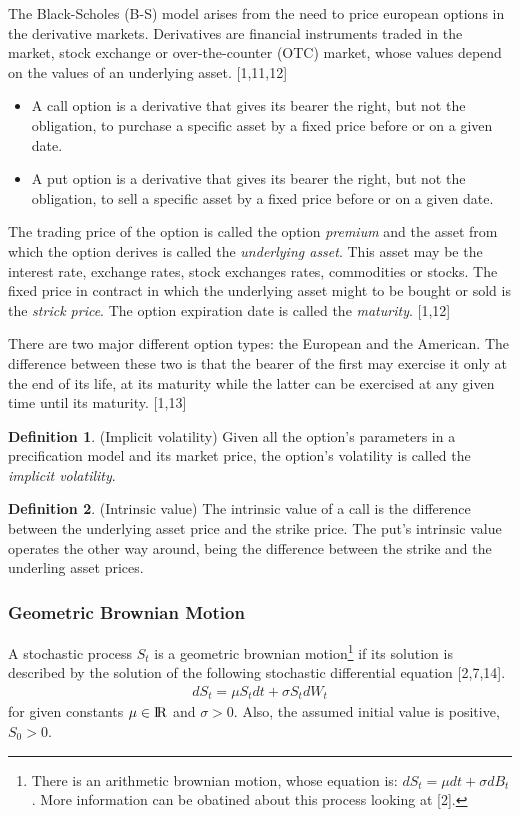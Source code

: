 \documentclass[12pt,twoside]{reedthesis}
\theoremstyle{definition}
\newtheorem{definition}{Definition}[section]
\theoremstyle{definition}
\theoremstyle{remark}
\begin{document}
  The Black-Scholes (B-S) model arises from the need to price european
  options in the derivative markets. Derivatives are financial instruments
  traded in the market, stock exchange or over-the-counter (OTC) market,
  whose values depend on the values of an underlying asset. {[}1,11,12{]}
  \begin{itemize}
  \item
    A call option is a derivative that gives its bearer the right, but not
    the obligation, to purchase a specific asset by a fixed price before
    or on a given date.
  \item
    A put option is a derivative that gives its bearer the right, but not
    the obligation, to sell a specific asset by a fixed price before or on
    a given date.
  \end{itemize}
  The trading price of the option is called the option \emph{premium} and
  the asset from which the option derives is called the \emph{underlying
  asset}. This asset may be the interest rate, exchange rates, stock
  exchanges rates, commodities or stocks. The fixed price in contract in
  which the underlying asset might to be bought or sold is the
  \emph{strick price}. The option expiration date is called the
  \emph{maturity}. {[}1,12{]}
  
  There are two major different option types: the European and the
  American. The difference between these two is that the bearer of the
  first may exercise it only at the end of its life, at its maturity while
  the latter can be exercised at any given time until its maturity.
  {[}1,13{]}
  \begin{definition}{(Implicit volatility)} 
  Given all the option's parameters in a precification model and its market price, the option's volatility is called the \textit{implicit volatility}.
  \end{definition}
  \begin{definition}{(Intrinsic value)} 
  The intrinsic value of a call is the difference between the underlying asset price and the strike price. The put's intrinsic value operates the other way around, being the difference between the strike and the underling asset prices.
  \end{definition}
  \subsubsection{Geometric Brownian Motion}\label{gbm}
  
  A stochastic process \(S_t\) is a geometric brownian motion\footnote{There
    is an arithmetic brownian motion, whose equation is:
    \(dS_t = \mu dt + \sigma dB_t\). More information can be obatined
    about this process looking at {[}2{]}.} if its solution is described
  by the solution of the following stochastic differential equation
  {[}2,7,14{]}.
  \begin{align}
  dS_t = \mu S_t dt + \sigma S_t dW_t
  \end{align}
  \noindent
  for given constants \(\mu \in {\rm I\!R}\) and \(\sigma > 0\). Also, the
  assumed initial value is positive, \(S_0 >0\).
  
\end{document}
